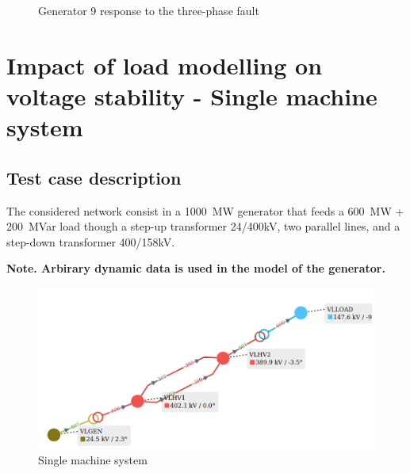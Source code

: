 \documentclass[a4paper, 12pt]{report}
\begin{document}
\begin{figure}[H]
\caption{Generator 9 response to the three-phase fault}
\end{figure}

\chapter{Impact of load modelling on voltage stability - Single machine system}

\section{Test case description}

The considered network consist in a 1000~MW generator that feeds a 600~MW + 200~MVar load though a step-up transformer 24/400kV, two parallel lines, and a step-down transformer 400/158kV.

\textbf{Note. Arbirary dynamic data is used in the model of the generator.}

\begin{figure}[H]
  \includegraphics[width=\textwidth]{SingleMachineSystem.png}
  \caption{Single machine system}
\end{figure}
\end{document}
